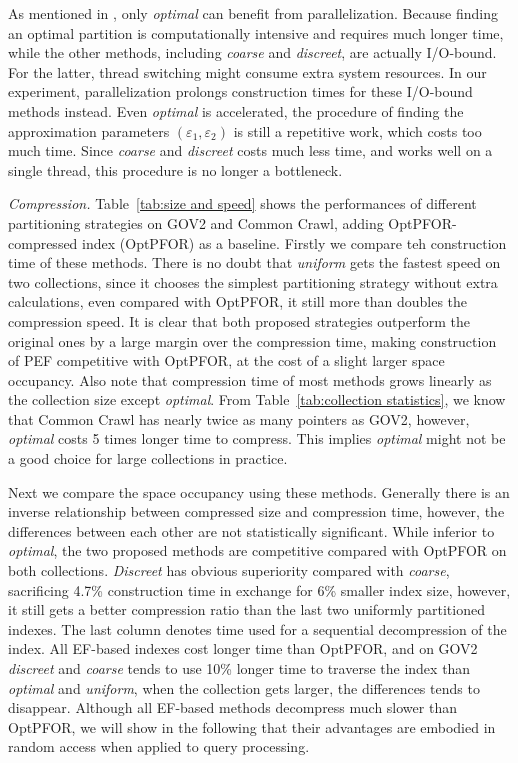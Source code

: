 \documentclass[runningheads,a4paper]{llncs}
\begin{document}
As mentioned in \cite{ottaviano2014partitioned}, only \textit{optimal} can benefit from parallelization.
Because finding an optimal partition is computationally intensive and requires much longer time, while the other methods, including \textit{coarse} and \textit{discreet}, are actually I/O-bound.
For the latter, thread switching might consume extra system resources.
In our experiment, parallelization prolongs construction times for these I/O-bound methods instead.
Even \textit{optimal} is accelerated, the procedure of finding the approximation parameters $ \left( \varepsilon_1, \varepsilon_2 \right) $ is still a repetitive work, which costs too much time.
Since \textit{coarse} and \textit{discreet} costs much less time, and works well on a single thread, this procedure is no longer a bottleneck.

\textit{Compression.} Table~\ref{tab:size and speed} shows the performances of different partitioning strategies on GOV2 and Common Crawl, adding OptPFOR-compressed index (OptPFOR) as a baseline.
Firstly we compare teh construction time of these methods.
There is no doubt that \textit{uniform} gets the fastest speed on two collections, since it chooses the simplest partitioning strategy without extra calculations, even compared with OptPFOR, it still more than doubles the compression speed.
It is clear that both proposed strategies outperform the original ones by a large margin over the compression time, making construction of PEF competitive with OptPFOR, at the cost of a slight larger space occupancy.
Also note that compression time of most methods grows linearly as the collection size except \textit{optimal}.
From Table~\ref{tab:collection statistics}, we know that Common Crawl has nearly twice as many pointers as GOV2, however, \textit{optimal} costs 5 times longer time to compress.
This implies \textit{optimal} might not be a good choice for large collections in practice.

Next we compare the space occupancy using these methods.
Generally there is an inverse relationship between compressed size and compression time, however, the differences between each other are not statistically significant.
While inferior to \textit{optimal}, the two proposed methods are competitive compared with OptPFOR on both collections.
\textit{Discreet} has obvious superiority compared with \textit{coarse}, sacrificing 4.7\% construction time in exchange for 6\% smaller index size, however, it still gets a better compression ratio than the last two uniformly partitioned indexes.
The last column denotes time used for a sequential decompression of the index.
All EF-based indexes cost longer time than OptPFOR, and on GOV2 \textit{discreet} and \textit{coarse} tends to use 10\% longer time to traverse the index than \textit{optimal} and \textit{uniform}, when the collection gets larger, the differences tends to disappear.
Although all EF-based methods decompress much slower than OptPFOR, we will show in the following that their advantages are embodied in random access when applied to query processing.
\end{document}

